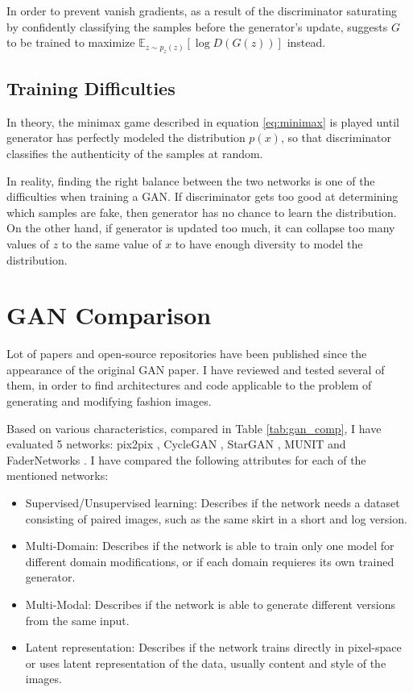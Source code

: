 \documentclass{article}
\begin{document}
In order to prevent vanish gradients, as a result of the discriminator saturating by confidently classifying the samples before the generator's update, \cite{goodfellow_generative_2014} suggests $G$ to be trained to maximize $\mathbb{E}_{z \sim p_{z}(z)}[\log D(G(z))]$ instead.

\subsection{Training Difficulties}
In theory, the minimax game described in equation \ref{eq:minimax} is played until generator has perfectly modeled the distribution $p(x)$, so that discriminator classifies the authenticity of the samples at random. 

In reality, finding the right balance between the two networks is one of the difficulties when training a GAN. If discriminator gets too good at determining which samples are fake, then generator has no chance to learn the distribution. On the other hand, if generator is updated too much, it can collapse too many values of $z$ to the same value of $x$ to have enough diversity to model the distribution.

\section{GAN Comparison}
Lot of papers and open-source repositories have been published since the appearance of the original GAN paper. I have reviewed and tested several of them, in order to find architectures and code applicable to the problem of generating and modifying fashion images. 

Based on various characteristics, compared in Table \ref{tab:gan_comp}, I have evaluated  5 networks: pix2pix \cite{isola_image--image_2016}, CycleGAN \cite{zhu_unpaired_2017}, StarGAN \cite{choi_stargan:_2017}, MUNIT \cite{huang_multimodal_2018} and FaderNetworks \cite{lample_fader_2017}. I have compared the following attributes for each of the mentioned networks:
\begin{itemize}
\item Supervised/Unsupervised learning: Describes if the network needs a dataset consisting of paired images, such as the same skirt in a short and log version.
\item Multi-Domain: Describes if the network is able to train only one model for different domain modifications, or if each domain requieres its own trained generator.
\item Multi-Modal: Describes if the network is able to generate different versions from the same input.
\item Latent representation: Describes if the network trains directly in pixel-space or uses latent representation of the data, usually content and style of the images.
\end{itemize}
\end{document}
